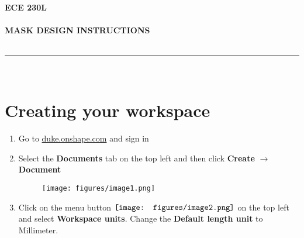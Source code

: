 \documentclass[12pt]{../manual}
\begin{document}
\begin{center}
\textbf{\huge ECE 230L}\\~\\
\textbf{\large MASK DESIGN INSTRUCTIONS}\\~\\
\rule{6.5in}{0.5mm}\\
\end{center}
%
\section{Creating your workspace}
\begin{enumerate}
\item Go to \url{duke.onshape.com} and sign in
\item Select the {\bf Documents} tab on the top left and then click {\bf Create} $\to$ {\bf Document}
\begin{figure}[ht!]
\centering
\texttt{[image: figures/image1.png]}

\end{figure}
\item Click on the menu button $\vcenter{\hbox{\texttt{[image: figures/image2.png]}}}$ on the top left and select {\bf Workspace units}. Change the {\bf Default length unit} to Millimeter.
\end{enumerate}
\newpage
\end{document}
